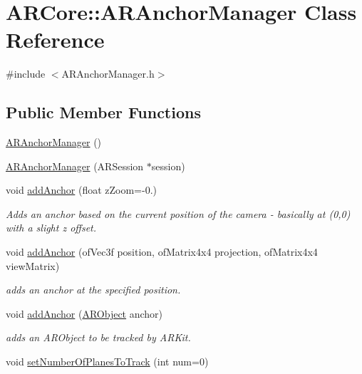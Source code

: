 \hypertarget{class_a_r_core_1_1_a_r_anchor_manager}{}\section{A\+R\+Core\+:\+:A\+R\+Anchor\+Manager Class Reference}
\label{class_a_r_core_1_1_a_r_anchor_manager}


{\ttfamily \#include $<$A\+R\+Anchor\+Manager.\+h$>$}

\subsection*{Public Member Functions}
\begin{DoxyCompactItemize}
\item 
\hyperlink{class_a_r_core_1_1_a_r_anchor_manager_ad4f5727e58d9b4c6f582c50ba5ac0f49}{A\+R\+Anchor\+Manager} ()
\item 
\hyperlink{class_a_r_core_1_1_a_r_anchor_manager_a471dcdacaedea4647a04c34052742a61}{A\+R\+Anchor\+Manager} (A\+R\+Session $\ast$session)
\item 
void \hyperlink{class_a_r_core_1_1_a_r_anchor_manager_a462546bf84296188fd899d533a3c17bd}{add\+Anchor} (float z\+Zoom=-\/0.)
\begin{DoxyCompactList}\small\item\em Adds an anchor based on the current position of the camera -\/ basically at (0,0) with a slight z offset. \end{DoxyCompactList}\item 
void \hyperlink{class_a_r_core_1_1_a_r_anchor_manager_adcd398aa9ed15e22b7110fcbfa8bd929}{add\+Anchor} (of\+Vec3f position, of\+Matrix4x4 projection, of\+Matrix4x4 view\+Matrix)
\begin{DoxyCompactList}\small\item\em adds an anchor at the specified position. \end{DoxyCompactList}\item 
void \hyperlink{class_a_r_core_1_1_a_r_anchor_manager_ae710a985f06cfe488f218f49e8d0329a}{add\+Anchor} (\hyperlink{struct_a_r_objects_1_1_a_r_object}{A\+R\+Object} anchor)
\begin{DoxyCompactList}\small\item\em adds an A\+R\+Object to be tracked by A\+R\+Kit. \end{DoxyCompactList}\item 
void \hyperlink{class_a_r_core_1_1_a_r_anchor_manager_ab3ec0ff668e2adab3a0526ad79abd9f3}{set\+Number\+Of\+Planes\+To\+Track} (int num=0)

\end{DoxyCompactItemize}

